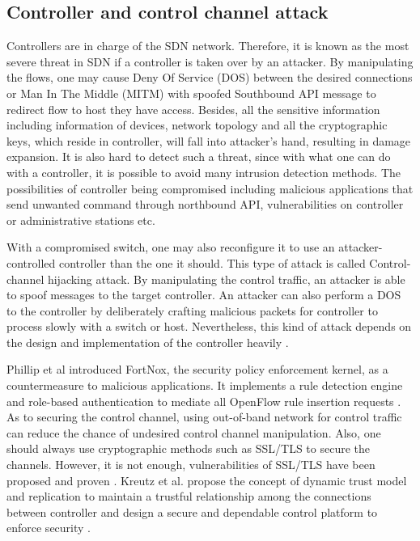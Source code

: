 \subsection{Controller and control channel attack}
Controllers are in charge of the SDN network. Therefore, it is known as the most severe threat in SDN if a controller is taken over by an attacker. By manipulating the flows, one may cause Deny Of Service (DOS) between the desired connections or Man In The Middle (MITM) with spoofed Southbound API message to redirect flow to host they have access. Besides, all the sensitive information including information of devices, network topology and all the cryptographic keys, which reside in controller, will fall into attacker's hand, resulting in damage expansion. It is also hard to detect such a threat, since with what one can do with a controller, it is possible to avoid many intrusion detection methods. The possibilities of controller being compromised including malicious applications that send unwanted command through northbound API, vulnerabilities on controller or administrative stations etc.

With a compromised switch, one may also reconfigure it to use an attacker-controlled controller than the one it should. This type of attack is called Control-channel hijacking attack. By manipulating the control traffic, an attacker is able to spoof messages to the target controller. An attacker can also perform a DOS to the controller by deliberately crafting malicious packets for controller to process slowly with a switch or host. Nevertheless, this kind of attack depends on the design and implementation of the controller heavily \cite{AAS14}.

Phillip et al introduced FortNox, the security policy enforcement kernel, as a countermeasure to malicious applications. It implements a rule detection engine and role-based authentication to mediate all OpenFlow rule insertion requests \cite{PSYFTG12}. As to securing the control channel, using out-of-band network for control traffic can reduce the chance of undesired control channel manipulation. Also, one should always use cryptographic methods such as SSL/TLS to secure the channels. However, it is not enough, vulnerabilities of SSL/TLS have been proposed and proven \cite{HRKC12}. Kreutz et al. propose the concept of dynamic trust model and replication to maintain a trustful relationship among the connections between controller and design a secure and dependable control platform to enforce security \cite{KDFRV13}. 

